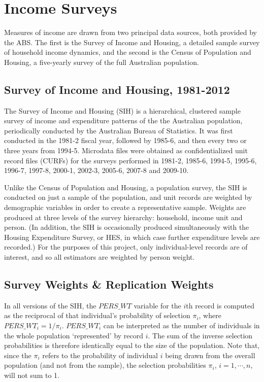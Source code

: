 \chapter{Income Surveys}\label{app:data}

Measures of income are drawn from two principal data sources, both provided by the ABS. The first is the Survey of Income and Housing, a detailed sample survey of household income dynamics, and the second is the Census of Population and Housing, a five-yearly survey of the full Australian population. 

\section{Survey of Income and Housing, 1981-2012}\label{sec:SIH}


The Survey of Income and Housing (SIH) is a hierarchical, clustered sample survey of income and expenditure patterns of the the Australian population, periodically conducted by the Australian Bureau of Statistics. It was first conducted in the 1981-2 fiscal year, followed by 1985-6, and then every two or three years from 1994-5. Microdata files were obtained as confidentialized unit record files (CURFs) for the surveys performed in 1981-2, 1985-6, 1994-5, 1995-6, 1996-7, 1997-8, 2000-1, 2002-3, 2005-6, 2007-8 and 2009-10.

Unlike the Census of Population and Housing, a population survey, the SIH is conducted on just a sample of the population, and unit records are weighted by demographic variables in order to create a representative sample. Weights are produced at three levels of the survey hierarchy: household, income unit and person. (In addition, the SIH is occasionally produced simultaneously with the Housing Expenditure Survey, or HES, in which case further expenditure levels are recorded.) For the purposes of this project, only individual-level records are of interest, and so all estimators are weighted by person weight.

\section{Survey Weights \& Replication Weights}

In all versions of the SIH, the $PERS\_WT$ variable for the $i$th record is computed as the reciprocal of that individual's probability of selection $\pi_i$, where $PERS\_WT_i = 1/\pi_i.$ $PERS\_WT_i$ can be interpreted as the number of individuals in the whole population `represented' by record $i$. The sum of the inverse selection probabilities is therefore identically equal to the size of the population. Note that, since the $\pi_i$ refers to the probability of individual $i$ being drawn from the overall population (and not from the sample), the selection probabilities $\pi_i$, $i=1,\cdots,n$, will not sum to 1.

